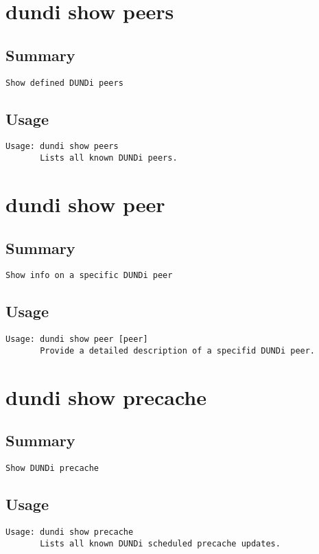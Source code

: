 \section{dundi show peers}
\subsection{Summary}
\begin{verbatim}
Show defined DUNDi peers
\end{verbatim}
\subsection{Usage}
\begin{verbatim}
Usage: dundi show peers
       Lists all known DUNDi peers.

\end{verbatim}


\section{dundi show peer}
\subsection{Summary}
\begin{verbatim}
Show info on a specific DUNDi peer
\end{verbatim}
\subsection{Usage}
\begin{verbatim}
Usage: dundi show peer [peer]
       Provide a detailed description of a specifid DUNDi peer.

\end{verbatim}


\section{dundi show precache}
\subsection{Summary}
\begin{verbatim}
Show DUNDi precache
\end{verbatim}
\subsection{Usage}
\begin{verbatim}
Usage: dundi show precache
       Lists all known DUNDi scheduled precache updates.

\end{verbatim}


